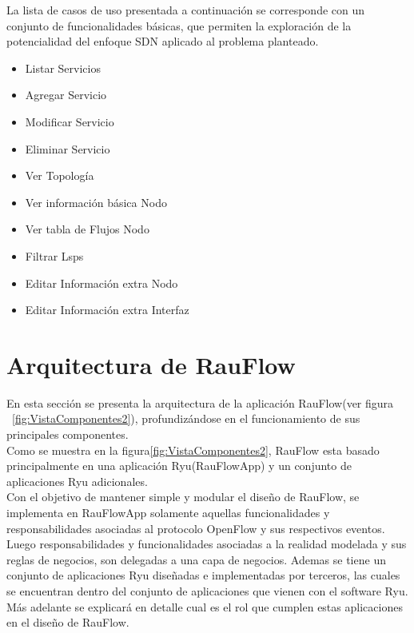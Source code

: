 La lista de casos de uso presentada a continuaci\'on se corresponde con un conjunto de funcionalidades b\'asicas, que permiten la exploraci\'on de la potencialidad del enfoque SDN aplicado al problema planteado. 

\begin{itemize}
\item Listar Servicios
\item Agregar Servicio
\item Modificar Servicio
\item Eliminar Servicio
\item Ver Topolog\'ia
\item Ver informaci\'on b\'asica Nodo
\item Ver tabla de Flujos Nodo
\item Filtrar Lsps
\item Editar Informaci\'on extra Nodo
\item Editar Informaci\'on extra Interfaz
\end{itemize}

\section[Arquitectura de RauFlow]{Arquitectura de RauFlow}

En esta secci\'on se presenta la arquitectura de la aplicación RauFlow(ver figura ~\ref{fig:VistaComponentes2}), profundizándose en el funcionamiento de sus principales componentes.\\

Como se muestra en la figura\ref{fig:VistaComponentes2}, RauFlow esta basado principalmente en una aplicaci\'on Ryu(RauFlowApp) y un conjunto de aplicaciones Ryu adicionales.\\ 

Con el objetivo de mantener simple y modular el dise\~no de RauFlow, se implementa en RauFlowApp solamente aquellas funcionalidades y responsabilidades asociadas al protocolo OpenFlow y sus respectivos eventos. Luego responsabilidades y funcionalidades asociadas a la realidad modelada y sus reglas de negocios, son delegadas a una capa de negocios. Ademas se tiene un conjunto de aplicaciones Ryu dise\~nadas e implementadas por terceros, las cuales se encuentran dentro del conjunto de aplicaciones que vienen con el software Ryu. M\'as adelante se explicar\'a en detalle cual es el rol que cumplen estas aplicaciones en el dise\~no de RauFlow.

